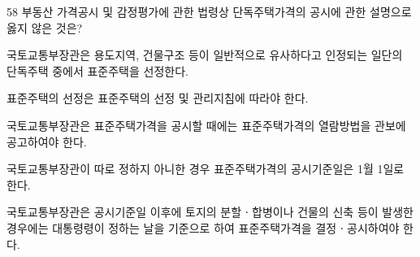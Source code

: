 \begin{question}{58}
부동산 가격공시 및 감정평가에 관한 법령상 단독주택가격의 공시에 관한 설명으로 옳지 않은 것은?
\begin{choices}
  \item 국토교통부장관은 용도지역, 건물구조 등이 일반적으로 유사하다고 인정되는 일단의 단독주택 중에서 표준주택을 선정한다.
  \item 표준주택의 선정은 표준주택의 선정 및 관리지침에 따라야 한다.
  \item 국토교통부장관은 표준주택가격을 공시할 때에는 표준주택가격의 열람방법을 관보에 공고하여야 한다.
  \item 국토교통부장관이 따로 정하지 아니한 경우 표준주택가격의 공시기준일은 1월 1일로 한다.
  \item 국토교통부장관은 공시기준일 이후에 토지의 분할ㆍ합병이나 건물의 신축 등이 발생한 경우에는 대통령령이 정하는 날을 기준으로 하여 표준주택가격을 결정ㆍ공시하여야 한다.
\end{choices}
\end{question}

